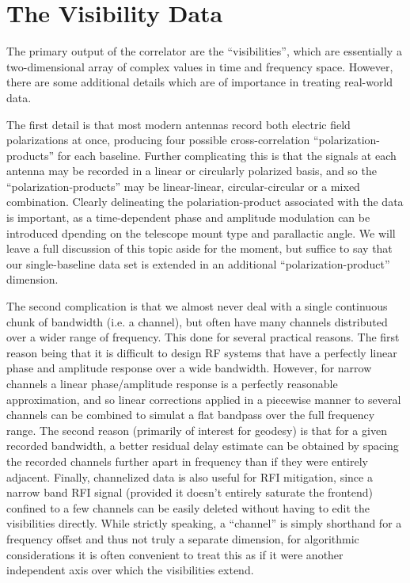 \section{The Visibility Data}

The primary output of the correlator are the ``visibilities'', which are essentially a two-dimensional array of complex values in time and frequency space. However, there are some additional details which are of importance in treating real-world data. 

The first detail is that most modern antennas record both electric field polarizations at once, producing four possible cross-correlation ``polarization-products'' for each baseline. Further complicating this is that the signals at each antenna may be recorded in a linear or circularly polarized basis, and so the ``polarization-products'' may be linear-linear, circular-circular or a mixed combination. Clearly delineating the polariation-product associated with the data is important, as a 
time-dependent phase and amplitude modulation can be introduced dpending on the telescope mount type and parallactic angle. We will leave a full discussion of this topic aside for the moment, but suffice to say that our single-baseline data set is extended in an additional ``polarization-product'' dimension.

The second complication is that we almost never deal with a single continuous chunk of bandwidth (i.e. a channel), but often have many channels distributed over a wider range of frequency. This done for several practical reasons. The first reason being that it is difficult to design RF systems that have a perfectly linear phase and amplitude response over a wide bandwidth. However, for narrow channels a linear phase/amplitude response is a perfectly reasonable approximation, and so linear corrections applied in a piecewise manner to several channels can be combined to simulat a flat bandpass over the full frequency range. The second reason (primarily of interest for geodesy) is that for a given recorded bandwidth, a better residual delay estimate can be obtained by spacing the recorded channels further apart in frequency than if they were entirely adjacent. Finally, channelized data
is also useful for RFI mitigation, since a narrow band RFI signal (provided it doesn't entirely saturate the frontend)
confined to a few channels can be easily deleted without having to edit the visibilities directly. While strictly speaking, a ``channel'' is simply shorthand for a frequency offset and thus not truly a separate dimension, for algorithmic considerations it is often convenient to treat this as if it were another independent axis over which the visibilities extend.

